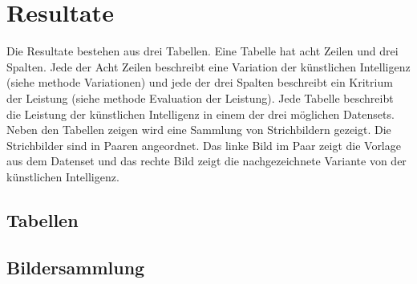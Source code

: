 \chapter{Resultate}
Die Resultate bestehen aus drei Tabellen. Eine Tabelle hat acht Zeilen und drei
Spalten. Jede der Acht Zeilen beschreibt eine Variation der künstlichen
Intelligenz (siehe methode Variationen) und jede der drei Spalten beschreibt ein Kritrium  %
der Leistung (siehe methode Evaluation der Leistung). Jede Tabelle beschreibt die Leistung  %
der künstlichen Intelligenz in einem der drei möglichen Datensets. Neben den
Tabellen zeigen wird eine Sammlung von Strichbildern gezeigt. Die Strichbilder
sind in Paaren angeordnet. Das linke Bild im Paar zeigt die Vorlage aus dem
Datenset und das rechte Bild zeigt die nachgezeichnete Variante von der
künstlichen Intelligenz.

\section{Tabellen}


\section{Bildersammlung}
